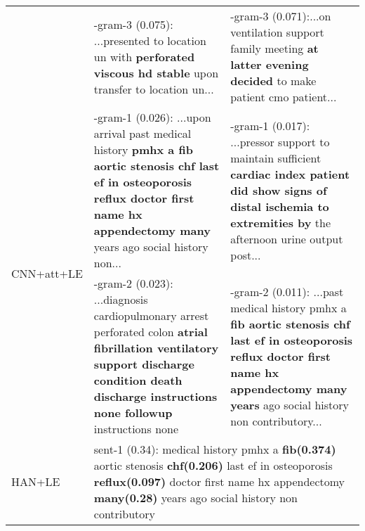 \documentclass[final,5p,times,twocolumn]{elsarticle}
\begin{document}
\begin{table*}[th]
\begin{threeparttable}
\begin{tabular}{lp{7.5cm}||p{7.5cm}}
                         & -gram-3 (0.075): ...presented to location un with \textbf{perforated viscous hd stable} upon transfer to location un...
                         & -gram-3 (0.071):...on ventilation support family meeting \textbf{at latter evening decided} to make patient cmo patient...\\
\cline{1-3}
\multirow{2}{*}{CNN+att+LE} & -gram-1 (0.026): ...upon arrival past medical history \textbf{pmhx a fib aortic stenosis chf last ef in osteoporosis reflux doctor first name hx appendectomy many} years ago social history non...                                                                                                                                                                                                                                                                             & -gram-1 (0.017): ...pressor support to maintain sufficient \textbf{cardiac index patient did show signs of distal ischemia to extremities by} the afternoon urine output post...                                                                                                                                                                                                                                          \\
\cline{2-3}
                         & -gram-2 (0.023): ...diagnosis cardiopulmonary arrest perforated colon \textbf{atrial fibrillation ventilatory support discharge condition death discharge instructions none followup} instructions none                                                                                                                                                                                                                                                                           & -gram-2 (0.011): ...past medical history pmhx a \textbf{fib aortic stenosis chf last ef in osteoporosis reflux doctor first name hx appendectomy many years} ago social history non contributory...                                                                                                                                                                                                              \\
\cline{1-3}\cline{1-3}
\multirow{3}{*}{HAN+LE}  & \multicolumn{2}{p{15cm}}{sent-1 (0.34): medical history pmhx a \textbf{fib(0.374)} aortic stenosis \textbf{chf(0.206)} last ef in osteoporosis \textbf{reflux(0.097)} doctor first name hx appendectomy \textbf{many(0.28)} years ago social history non contributory}\\

\end{tabular}
\end{threeparttable}
\end{table*}
\end{document}

